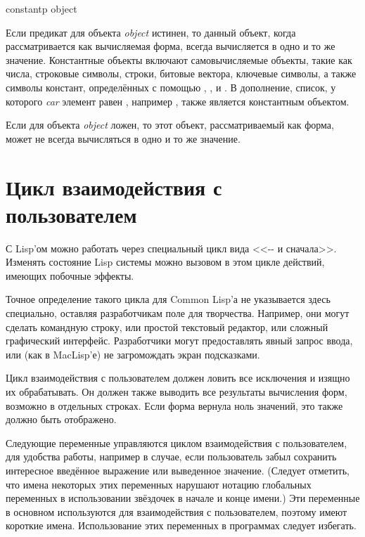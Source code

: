 \begin{defun}[Функция]
constantp object

Если предикат  для объекта \emph{object} истинен, то данный
объект, когда рассматривается как вычисляемая форма, всегда вычисляется в одно и
то же значение.
Константные объекты включают самовычисляемые объекты, такие как числа, строковые
символы, строки, битовые вектора, ключевые символы, а также символы констант,
определённых с помощью , ,  и .
В дополнение, список, у которого \emph{car} элемент равен , например
, также является константным объектом.

Если  для объекта \emph{object} ложен, то этот объект,
рассматриваемый как форма, может не всегда вычисляться в одно и то же
значение.
\end{defun}

\section{Цикл взаимодействия с пользователем}

С Lisp'ом можно работать через специальный цикл вида
<<-- и сначала>>.
Изменять состояние Lisp системы можно вызовом в этом цикле действий, имеющих
побочные эффекты.  

Точное определение такого цикла для Common Lisp'а не указывается здесь
специально, оставляя разработчикам поле для творчества.
Например, они могут сделать командную строку, или простой текстовый редактор,
или сложный графический интерфейс. Разработчики могут предоставлять явный запрос
ввода, или (как в MacLisp'е) не загромождать экран подсказками.

Цикл взаимодействия с пользователем должен ловить все исключения и изящно их
обрабатывать. Он должен также выводить все результаты вычисления форм, возможно
в отдельных строках. Если форма вернула ноль значений, это также должно быть
отображено.

Следующие переменные управляются циклом взаимодействия с пользователем, для
удобства работы, например в случае, если пользователь забыл сохранить
интересное введённое выражение или выведенное значение. (Следует отметить, что
имена некоторых этих переменных нарушают нотацию глобальных переменных в
использовании звёздочек в начале и конце имени.) Эти переменные в основном
используются для взаимодействия с пользователем, поэтому имеют короткие
имена. Использование этих переменных в программах следует избегать.

